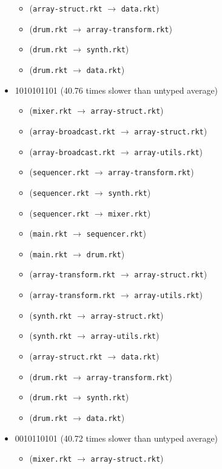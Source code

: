 \documentclass{article}
\newcommand{\mono}[1]{\texttt{#1}}
\begin{document}
\begin{itemize}
\begin{itemize}
  \item (\mono{array-struct.rkt} $\rightarrow$ \mono{data.rkt})
  \item (\mono{drum.rkt} $\rightarrow$ \mono{array-transform.rkt})
  \item (\mono{drum.rkt} $\rightarrow$ \mono{synth.rkt})
  \item (\mono{drum.rkt} $\rightarrow$ \mono{data.rkt})
  \end{itemize}
\item 1010101101 (40.76 times slower than untyped average)
  \begin{itemize}
  \item (\mono{mixer.rkt} $\rightarrow$ \mono{array-struct.rkt})
  \item (\mono{array-broadcast.rkt} $\rightarrow$ \mono{array-struct.rkt})
  \item (\mono{array-broadcast.rkt} $\rightarrow$ \mono{array-utils.rkt})
  \item (\mono{sequencer.rkt} $\rightarrow$ \mono{array-transform.rkt})
  \item (\mono{sequencer.rkt} $\rightarrow$ \mono{synth.rkt})
  \item (\mono{sequencer.rkt} $\rightarrow$ \mono{mixer.rkt})
  \item (\mono{main.rkt} $\rightarrow$ \mono{sequencer.rkt})
  \item (\mono{main.rkt} $\rightarrow$ \mono{drum.rkt})
  \item (\mono{array-transform.rkt} $\rightarrow$ \mono{array-struct.rkt})
  \item (\mono{array-transform.rkt} $\rightarrow$ \mono{array-utils.rkt})
  \item (\mono{synth.rkt} $\rightarrow$ \mono{array-struct.rkt})
  \item (\mono{synth.rkt} $\rightarrow$ \mono{array-utils.rkt})
  \item (\mono{array-struct.rkt} $\rightarrow$ \mono{data.rkt})
  \item (\mono{drum.rkt} $\rightarrow$ \mono{array-transform.rkt})
  \item (\mono{drum.rkt} $\rightarrow$ \mono{synth.rkt})
  \item (\mono{drum.rkt} $\rightarrow$ \mono{data.rkt})
  \end{itemize}
\item 0010110101 (40.72 times slower than untyped average)
  \begin{itemize}
  \item (\mono{mixer.rkt} $\rightarrow$ \mono{array-struct.rkt})

\end{itemize}
\end{itemize}
\end{document}
